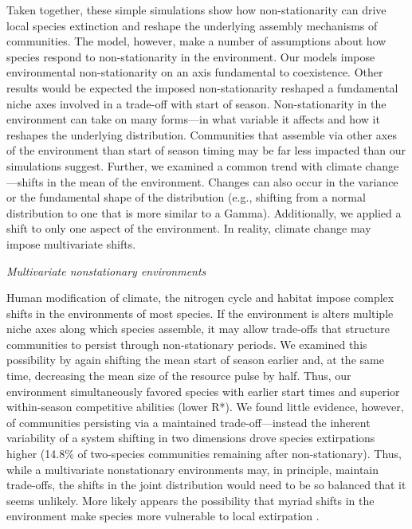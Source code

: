 \documentclass[11pt,letterpaper]{article}
\begin{document}
Taken together, these simple simulations show how non-stationarity can drive local species extinction and reshape the underlying assembly mechanisms of communities. The model, however, make a number of assumptions about how species respond to non-stationarity in the environment. Our models impose environmental non-stationarity on an axis fundamental to coexistence. Other results would be expected the imposed non-stationarity reshaped a fundamental niche axes involved in a trade-off with start of season. Non-stationarity in the environment can take on many forms---in what variable it affects and how it reshapes the underlying distribution. Communities that assemble via other axes of the environment than start of season timing may be far less impacted than our simulations suggest. Further, we examined a common trend with climate change---shifts in the mean of the environment. Changes can also occur in the variance or the fundamental shape of the distribution (e.g., shifting from a normal distribution to one that is more similar to a Gamma). Additionally, we applied a shift to only one aspect of the environment. In reality, climate change may impose multivariate shifts.

\emph{Multivariate nonstationary environments}

Human modification of climate, the nitrogen cycle and habitat impose complex shifts in the environments of most species. If the environment is alters multiple niche axes along which species assemble, it may allow trade-offs that structure communities to persist through non-stationary periods. We examined this possibility by again shifting the mean start of season earlier and, at the same time, decreasing the mean size of the resource pulse by half. Thus, our environment simultaneously favored species with earlier start times and superior within-season competitive abilities (lower R*). We found little evidence, however, of communities persisting via a maintained trade-off---instead the inherent variability of a system shifting in two dimensions drove species extirpations higher (14.8\% of two-species communities remaining after non-stationary). Thus, while a multivariate nonstationary environments may, in principle, maintain trade-offs, the shifts in the joint distribution would need to be so balanced that it seems unlikely. More likely appears the possibility that myriad shifts in the environment make species more vulnerable to local extirpation \citep{sixthectinction2011,IPCC:2014sm}.
\end{document}
